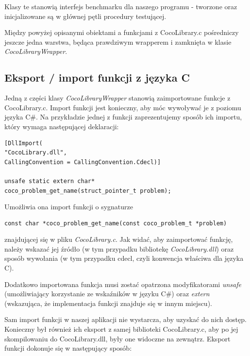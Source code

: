 \documentclass[12pt, twoside, openany, abstract=on]{report}
\theoremstyle{definition}
\begin{document}
Klasy te stanowią interfejs benchmarku dla naszego programu - tworzone oraz inicjalizowane są w głównej pętli procedury testującej.

Między powyżej opisanymi obiektami a funkcjami z CocoLibrary.c pośredniczy jeszcze jedna warstwa, będąca prawdziwym wrapperem i zamknięta w klasie \textit{CocoLibraryWrapper}.

\subsection{Eksport / import funkcji z języka C}

Jedną z części klasy \textit{CocoLibraryWrapper} stanowią zaimportowane funkcje z CocoLibrary.c. Import funkcji jest konieczny, aby móc wywoływać je z poziomu języka C\#. Na przykładzie jednej z funkcji zaprezentujemy sposób ich importu, który wymaga następującej deklaracji:\\

\begin{lstlisting}[frame=single]
[DllImport(
"CocoLibrary.dll", 
CallingConvention = CallingConvention.Cdecl)]

unsafe static extern char* 
coco_problem_get_name(struct_pointer_t problem);
\end{lstlisting}

Umożliwia ona import funkcji o sygnaturze

\begin{lstlisting}[frame=single]
const char *coco_problem_get_name(const coco_problem_t *problem)
\end{lstlisting}

znajdującej się w pliku \textit{CocoLibrary.c}. Jak widać, aby zaimportować funkcję, należy wskazać jej źródło (w tym przypadku bibliotekę \textit{CocoLibrary.dll}) oraz sposób wywołania (w tym przypadku cdecl, czyli konwencja właściwa dla języka C). 

Dodatkowo importowana funkcja musi zostać opatrzona modyfikatorami \textit{unsafe} (umożliwiający korzystanie ze wskaźników w języku C\#) oraz \textit{extern} (wskazująca, że implementacja funkcji znajduje się w innym miejscu).

Sam import funkcji w naszej aplikacji nie wystarcza, aby uzyskać do nich dostęp. Konieczny był również ich eksport z samej biblioteki CocoLibrary.c, aby po jej skompilowaniu do CocoLibrary.dll, były one widoczne na zewnątrz. Eksport funkcji dokonuje się w następujący sposób:\\
\end{document}
